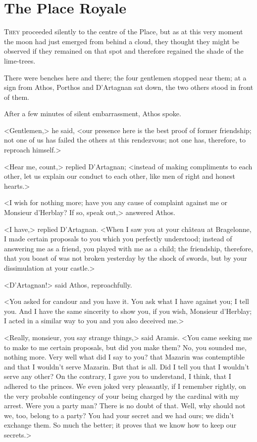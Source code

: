 \chapter{The Place Royale}

 \lettrine{T}{hey} proceeded silently to the centre of the Place, but as at this very moment the moon had just emerged from behind a cloud, they thought they might be observed if they remained on that spot and therefore regained the shade of the lime-trees.

\zz
There were benches here and there; the four gentlemen stopped near them; at a sign from Athos, Porthos and D'Artagnan sat down, the two others stood in front of them.

After a few minutes of silent embarrassment, Athos spoke.

<Gentlemen,> he said, <our presence here is the best proof of former friendship; not one of us has failed the others at this rendezvous; not one has, therefore, to reproach himself.>

<Hear me, count,> replied D'Artagnan; <instead of making compliments to each other, let us explain our conduct to each other, like men of right and honest hearts.>

<I wish for nothing more; have you any cause of complaint against me or Monsieur d'Herblay? If so, speak out,> answered Athos.

<I have,> replied D'Artagnan. <When I saw you at your château at Bragelonne, I made certain proposals to you which you perfectly understood; instead of answering me as a friend, you played with me as a child; the friendship, therefore, that you boast of was not broken yesterday by the shock of swords, but by your dissimulation at your castle.>

<D'Artagnan!> said Athos, reproachfully.

<You asked for candour and you have it. You ask what I have against you; I tell you. And I have the same sincerity to show you, if you wish, Monsieur d'Herblay; I acted in a similar way to you and you also deceived me.>

<Really, monsieur, you say strange things,> said Aramis. <You came seeking me to make to me certain proposals, but did you make them? No, you sounded me, nothing more. Very well what did I say to you? that Mazarin was contemptible and that I wouldn't serve Mazarin. But that is all. Did I tell you that I wouldn't serve any other? On the contrary, I gave you to understand, I think, that I adhered to the princes. We even joked very pleasantly, if I remember rightly, on the very probable contingency of your being charged by the cardinal with my arrest. Were you a party man? There is no doubt of that. Well, why should not we, too, belong to a party? You had your secret and we had ours; we didn't exchange them. So much the better; it proves that we know how to keep our secrets.>

